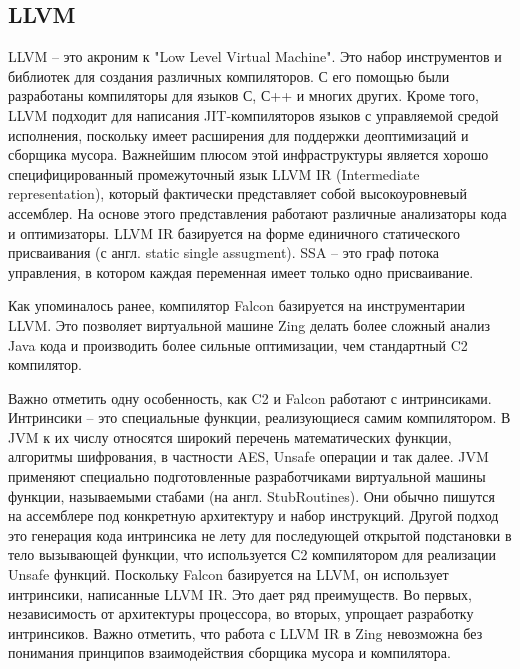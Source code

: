 \subsection{LLVM}
LLVM -- это акроним к "Low Level Virtual Machine". Это набор инструментов и библиотек для 
создания различных компиляторов. С его помощью были разработаны компиляторы для языков С, С++ и многих других. Кроме того, LLVM подходит для написания JIT-компиляторов языков с управляемой средой исполнения, поскольку имеет расширения для поддержки деоптимизаций и сборщика мусора. 
Важнейшим плюсом этой инфраструктуры является хорошо специфицированный промежуточный язык LLVM IR\cite{llvm-ref-man} (Intermediate representation), который фактически представляет собой высокоуровневый ассемблер. 
На основе этого представления работают различные анализаторы кода и оптимизаторы.
LLVM IR базируется на форме единичного статического присваивания (с англ. static single assugment). SSA -- это граф потока управления, в котором каждая переменная имеет только одно присваивание\cite{ssa-book}.
\par
Как упоминалось ранее, компилятор Falcon базируется на инструментарии LLVM. Это позволяет 
виртуальной машине Zing делать более сложный анализ Java кода и производить более сильные оптимизации, чем стандартный C2 компилятор\cite{falcon-gil}.
\par
Важно отметить одну особенность, как C2 и Falcon работают с интринсиками. 
Интринсики -- это специальные функции, реализующиеся самим компилятором. В JVM к их числу относятся широкий перечень математических функции, алгоритмы шифрования, в частности AES, Unsafe операции и так далее.
JVM применяют специально подготовленные разработчиками виртуальной машины функции, называемыми стабами (на англ. StubRoutines). Они обычно пишутся на ассемблере под конкретную
архитектуру и набор инструкций. Другой подход это генерация кода интринсика не лету для последующей открытой подстановки в тело вызывающей функции, что используется С2 компилятором для реализации Unsafe функций.
Поскольку Falcon базируется на LLVM, он использует интринсики, написанные LLVM IR. Это дает ряд преимуществ. Во первых, независимость от архитектуры процессора, во вторых, упрощает разработку интринсиков.
Важно отметить, что работа с LLVM IR в Zing невозможна без понимания принципов взаимодействия сборщика мусора и компилятора.


